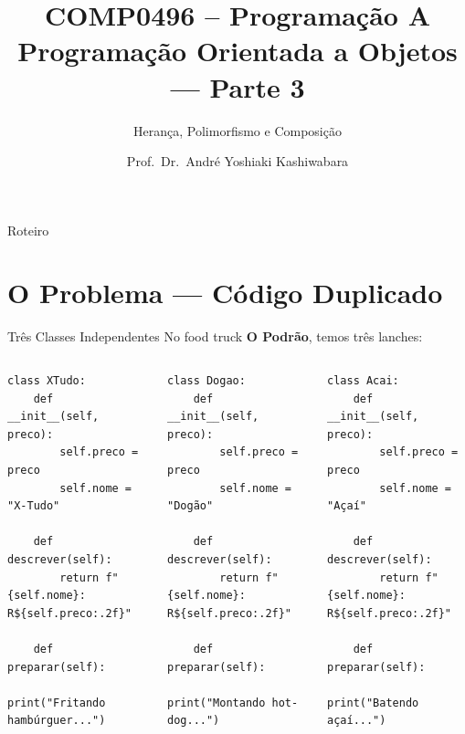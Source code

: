 \documentclass[aspectratio=169]{beamer}
\title{COMP0496 -- Programação A \\ Programação Orientada a Objetos — Parte 3}
\subtitle{Herança, Polimorfismo e Composição}
\author{Prof.\ Dr.\ André Yoshiaki Kashiwabara}
\institute{DCOMP -- Universidade Federal de Sergipe\\\texttt{andreyoshiaki@dcomp.ufs.br}}
\date{}
\begin{document}
\begin{frame}
  \titlepage
\end{frame}

\begin{frame}{Roteiro}
  \tableofcontents
\end{frame}

\section{O Problema — Código Duplicado}

\begin{frame}[fragile]{Três Classes Independentes}
  No food truck \textbf{O Podrão}, temos três lanches:

  \begin{columns}[T]
    \begin{lstlisting}
class XTudo:
    def __init__(self, preco):
        self.preco = preco
        self.nome = "X-Tudo"

    def descrever(self):
        return f"{self.nome}: R${self.preco:.2f}"

    def preparar(self):
        print("Fritando hambúrguer...")
    \end{lstlisting}

    \begin{lstlisting}
class Dogao:
    def __init__(self, preco):
        self.preco = preco
        self.nome = "Dogão"

    def descrever(self):
        return f"{self.nome}: R${self.preco:.2f}"

    def preparar(self):
        print("Montando hot-dog...")
    \end{lstlisting}

    \begin{lstlisting}
class Acai:
    def __init__(self, preco):
        self.preco = preco
        self.nome = "Açaí"

    def descrever(self):
        return f"{self.nome}: R${self.preco:.2f}"

    def preparar(self):
        print("Batendo açaí...")
    \end{lstlisting}
  \end{columns}
\end{frame}
\end{document}
